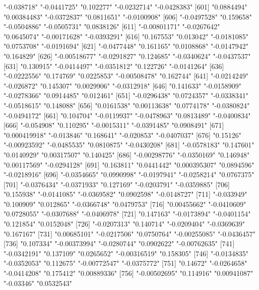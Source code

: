 \begin{Schunk}
\begin{Soutput}
[596] "-0.038718"    "-0.0441725"   "0.102277"     "-0.0232714"   "-0.0428383"  
[601] "0.0884494"    "0.00384483"   "-0.0372837"   "0.0811651"    "-0.0100908"  
[606] "-0.0497528"   "0.159658"     "-0.0504886"   "-0.0505731"   "0.0838126"   
[611] "-0.00801171"  "-0.0267642"   "0.0645074"    "-0.00171628"  "-0.0393291"  
[616] "0.167553"     "0.013042"     "-0.0181085"   "0.0753708"    "-0.0191694"  
[621] "-0.0477448"   "0.161165"     "0.0108868"    "-0.0147942"   "0.164829"    
[626] "-0.00518677"  "-0.0291827"   "0.124685"     "-0.0340624"   "-0.0437537"  
[631] "0.130915"     "-0.0414497"   "-0.0351812"   "0.122726"     "-0.0141264"  
[636] "-0.0222556"   "0.174769"     "0.0225853"    "-0.00508478"  "0.162744"    
[641] "-0.0214249"   "-0.026872"    "0.145307"     "0.0029906"    "-0.0312918"  
[646] "0.141633"     "-0.0158909"   "-0.0278366"   "0.0914485"    "0.012461"    
[651] "-0.0296438"   "0.0724357"    "-0.0338341"   "-0.0518615"   "0.148088"    
[656] "0.0161538"    "0.00113638"   "0.0774178"    "-0.0380824"   "-0.0494172"  
[661] "0.104704"     "-0.0119937"   "-0.0478963"   "0.0813489"    "-0.0400834"  
[666] "-0.054908"    "0.110295"     "-0.0015311"   "-0.0391485"   "0.0908491"   
[671] "0.000419918"  "-0.013846"    "0.168641"     "-0.020853"    "-0.0407037"  
[676] "0.15126"      "-0.00923592"  "-0.0485535"   "0.0810875"    "-0.0430208"  
[681] "-0.0578183"   "0.147601"     "0.0140929"    "0.00317507"   "0.140425"    
[686] "-0.00298776"  "-0.0350169"   "0.146948"     "0.00117569"   "-0.0294128"  
[691] "0.163811"     "0.0441442"    "0.000395307"  "0.0894596"    "-0.0218916"  
[696] "-0.0354665"   "0.0990998"    "-0.0197941"   "-0.0258214"   "0.0767375"   
[701] "-0.0376434"   "-0.0371933"   "0.127169"     "-0.0203791"   "-0.0359885"  
[706] "0.155938"     "-0.0141085"   "-0.0369582"   "0.0902598"    "-0.0148727"  
[711] "-0.033949"    "0.100909"     "0.012865"     "-0.0366748"   "0.0479753"   
[716] "0.00455662"   "-0.0410609"   "0.0728055"    "-0.0307688"   "-0.0406978"  
[721] "0.147163"     "-0.0173894"   "-0.0401154"   "0.121854"     "0.0152048"   
[726] "-0.0207313"   "0.140714"     "-0.0209404"   "-0.0369639"   "0.167167"    
[731] "0.00685101"   "-0.0217506"   "0.0750764"    "-0.00255085"  "-0.0436457"  
[736] "0.107334"     "-0.00373994"  "-0.0280744"   "0.0902622"    "-0.00762635" 
[741] "-0.0342191"   "0.137109"     "0.0265652"    "-0.00316519"  "0.158305"    
[746] "-0.0134835"   "-0.0352053"   "0.112675"     "-0.00772547"  "-0.0375772"  
[751] "0.14672"      "-0.0264658"   "-0.0414208"   "0.175412"     "0.00889336"  
[756] "-0.00502695"  "0.114916"     "0.00941087"   "-0.03346"     "0.0532543"   

\end{Soutput}
\end{Schunk}
